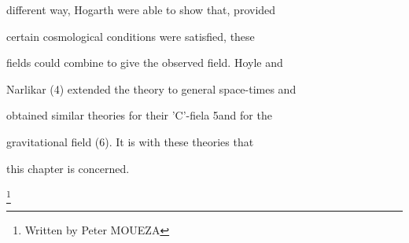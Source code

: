 \documentclass{article}
\begin{document}
different way, Hogarth were able to show that, provided

certain cosmological conditions were satisfied, these

fields could combine to give the observed field. Hoyle and

Narlikar (4) extended the theory to general space-times and

obtained similar theories for their 'C'-fiela 5and for the

gravitational field (6). It is with these theories that

this chapter is concerned.





\footnote{Written by Peter MOUEZA}
\end{document}

